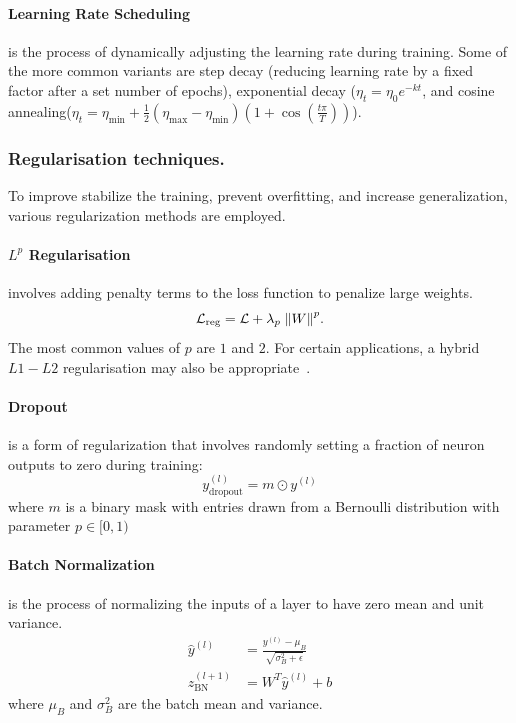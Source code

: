             
            
            \paragraph{Learning Rate Scheduling}is the process of dynamically adjusting the learning rate during training.
                Some of the more common variants are step decay (reducing learning rate by a fixed factor after a set number of epochs), exponential decay (\(\eta_t = \eta_0 e^{-kt}\), and cosine annealing(\(\eta_t = \eta_{\min} + \frac{1}{2}(\eta_{\max} - \eta_{\min})(1 + \cos(\frac{t\pi}{T}))\)).
        \subsubsection{Regularisation techniques.}
        \label{subsubsec:regularisation-techniques}
            To improve stabilize the training, prevent overfitting, and increase generalization, various regularization methods are employed.

            \paragraph{\(L^p\) Regularisation} involves adding penalty terms to the loss function to penalize large weights.
                \begin{equation}
                    \mathcal{L}_{\textrm{reg}} = \mathcal{L} + \lambda_p\;\norm{W}^p.
                \end{equation}
                The most common values of $p$ are $1$ and $2.$
                For certain applications, a hybrid $L1-L2$ regularisation may also be appropriate~\cite{shah_inverse_2016}.
            \paragraph{Dropout}is a form of regularization that involves randomly setting a fraction of neuron outputs to zero during training:
               \begin{equation}
                    y^{(l)}_{\text{dropout}} = m \odot y^{(l)}
               \end{equation}
               where \(m\) is a binary mask with entries drawn from a Bernoulli distribution with parameter $p\in [0, 1)$

            \paragraph{Batch Normalization} is the process of normalizing the inputs of a layer to have zero mean and unit variance.
                   \begin{align}
                   \hat{y}^{(l)} &= \frac{y^{(l)} - \mu_B}{\sqrt{\sigma_B^2 + \epsilon}} \\
                   z_{\text{BN}}^{(l+1)} &= W^T \hat{y}^{(l)} + b
                   \end{align}
                   where \(\mu_B\) and \(\sigma_B^2\) are the batch mean and variance.


